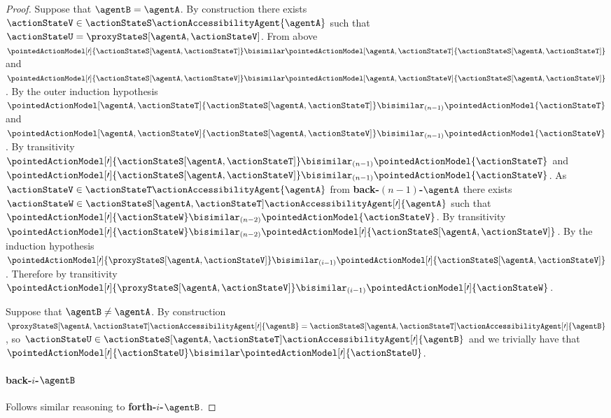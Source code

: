 \documentclass[twoside]{aiml14}
\begin{document}
\begin{proof}
      Suppose that $\agentB = \agentA$. 
      By construction there exists $\actionStateV \in \actionStateS \actionAccessibilityAgent{\agentA}$ 
      such that $\actionStateU = \proxyStateS[\agentA,\actionStateV]$.
      From above $\pointedActionModel[\prime]{\actionStateS[\agentA,\actionStateT]} \bisimilar \pointedActionModel[\agentA,\actionStateT]{\actionStateS[\agentA,\actionStateT]}$
      and $\pointedActionModel[\prime]{\actionStateS[\agentA,\actionStateV]} \bisimilar \pointedActionModel[\agentA,\actionStateV]{\actionStateS[\agentA,\actionStateV]}$.
      By the outer induction hypothesis $\pointedActionModel[\agentA,\actionStateT]{\actionStateS[\agentA,\actionStateT]} \bisimilar_{(n - 1)} \pointedActionModel{\actionStateT}$
      and $\pointedActionModel[\agentA,\actionStateV]{\actionStateS[\agentA,\actionStateV]} \bisimilar_{(n - 1)} \pointedActionModel{\actionStateV}$.
      By transitivity $\pointedActionModel[\prime]{\actionStateS[\agentA,\actionStateT]} \bisimilar_{(n - 1)} \pointedActionModel{\actionStateT}$
      and $\pointedActionModel[\prime]{\actionStateS[\agentA,\actionStateV]} \bisimilar_{(n - 1)} \pointedActionModel{\actionStateV}$.
      As $\actionStateV \in \actionStateT \actionAccessibilityAgent{\agentA}$ from {\bf back-$(n - 1)$-$\agentA$}
      there exists $\actionStateW \in \actionStateS[\agentA,\actionStateT] \actionAccessibilityAgent[\prime]{\agentA}$
      such that $\pointedActionModel[\prime]{\actionStateW} \bisimilar_{(n - 2)} \pointedActionModel{\actionStateV}$.
      By transitivity $\pointedActionModel[\prime]{\actionStateW} \bisimilar_{(n - 2)} \pointedActionModel[\prime]{\actionStateS[\agentA,\actionStateV]}$.
      By the induction hypothesis $\pointedActionModel[\prime]{\proxyStateS[\agentA,\actionStateV]} \bisimilar_{(i - 1)} \pointedActionModel[\prime]{\actionStateS[\agentA,\actionStateV]}$.
      Therefore by transitivity $\pointedActionModel[\prime]{\proxyStateS[\agentA,\actionStateV]} \bisimilar_{(i - 1)} \pointedActionModel[\prime]{\actionStateW}$.

      Suppose that $\agentB \neq \agentA$. By construction
      $\proxyStateS[\agentA,\actionStateT] \actionAccessibilityAgent[\prime]{\agentB} = \actionStateS[\agentA,\actionStateT] \actionAccessibilityAgent[\prime]{\agentB}$,
      so $\actionStateU \in \actionStateS[\agentA,\actionStateT] \actionAccessibilityAgent[\prime]{\agentB}$ 
      and we trivially have that $\pointedActionModel[\prime]{\actionStateU} \bisimilar \pointedActionModel[\prime]{\actionStateU}$.

      \paragraph{back-$i$-$\agentB$} Follows similar reasoning to {\bf forth-$i$-$\agentB$}.


\end{proof}
\end{document}

